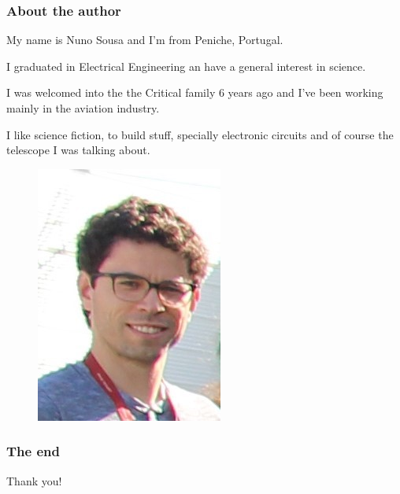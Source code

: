 \documentclass{beamer}
\begin{document}
\begin{frame}
\frametitle{About the author}
My name is Nuno Sousa and I'm from Peniche, Portugal.

I graduated in Electrical Engineering an have a general interest in science.

I was welcomed into the the Critical family 6 years ago and I've been working mainly in the aviation industry.

I like science fiction, to build stuff, specially electronic circuits and of course the telescope I was talking about.

\begin{figure}
\includegraphics[scale=0.3]{assets/self.jpg}
\end{figure}
\end{frame}

\begin{frame}
\frametitle{The end}
\centering
Thank you!
\end{frame}
\end{document}
